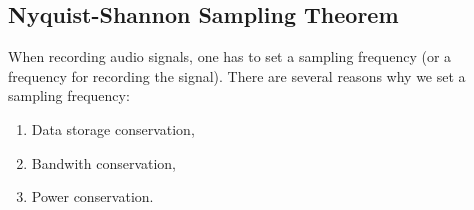 \subsection{Nyquist-Shannon Sampling Theorem}
When recording audio signals, one has to set a sampling frequency (or a frequency for recording the signal). There are several reasons why we set a sampling frequency:
\begin{enumerate}
	\item Data storage conservation,
	\item Bandwith conservation,
	\item Power conservation.
\end{enumerate}

